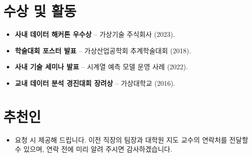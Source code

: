 \documentclass[11pt,a4paper,sans]{moderncv}
\begin{document}

\section{수상 및 활동}
\vspace{1pt}
\begin{itemize}
\item{\textbf{사내 데이터 해커톤 우수상} -- 가상기술 주식회사 (2023).}
\item{\textbf{학술대회 포스터 발표} -- 가상산업공학회 추계학술대회 (2018).}
\item{\textbf{사내 기술 세미나 발표} -- 시계열 예측 모델 운영 사례 (2022).}
\item{\textbf{교내 데이터 분석 경진대회 장려상} -- 가상대학교 (2016).}
\end{itemize}


\section{추천인}
\vspace{1pt}
\begin{itemize}
\item{요청 시 제공해 드립니다. 이전 직장의 팀장과 대학원 지도 교수의 연락처를 전달할 수 있으며, 연락 전에 미리 알려 주시면 감사하겠습니다.}
\end{itemize}
\end{document}
